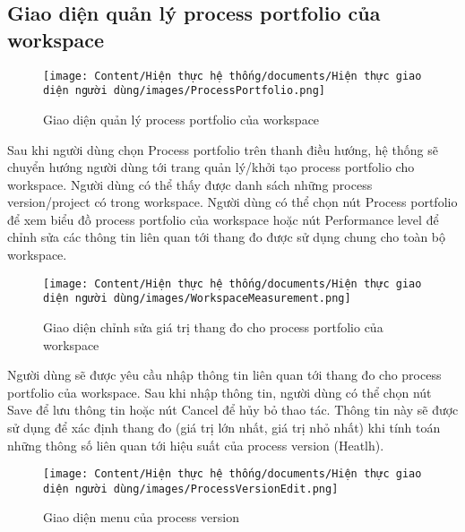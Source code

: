 \subsection{Giao diện quản lý process portfolio của workspace}

\begin{figure}[H]
    \centering
    \texttt{[image: Content/Hiện thực hệ thống/documents/Hiện thực giao diện người dùng/images/ProcessPortfolio.png]}
    \vspace{0.5cm}
    \caption{Giao diện quản lý process portfolio của workspace}
    \label{fig: Giao diện quản lý process portfolio của workspace}
\end{figure}

Sau khi người dùng chọn Process portfolio trên thanh điều hướng, hệ thống sẽ chuyển hướng người dùng tới trang quản lý/khởi tạo process portfolio cho workspace. Người dùng có thể thấy được danh sách những process version/project có trong workspace. Người dùng có thể chọn nút Process portfolio để xem biểu đồ process portfolio của workspace hoặc nút Performance level để chỉnh sửa các thông tin liên quan tới thang đo được sử dụng chung cho toàn bộ workspace.

\begin{figure}[H]
    \centering
    \texttt{[image: Content/Hiện thực hệ thống/documents/Hiện thực giao diện người dùng/images/WorkspaceMeasurement.png]}
    \vspace{0.5cm}
    \caption{Giao diện chỉnh sửa giá trị thang đo cho process portfolio của workspace}
    \label{fig: Giao diện chỉnh sửa giá trị thang đo cho process portfolio của workspace}
\end{figure}

Người dùng sẽ được yêu cầu nhập thông tin liên quan tới thang đo cho process portfolio của workspace. Sau khi nhập thông tin, người dùng có thể chọn nút Save để lưu thông tin hoặc nút Cancel để hủy bỏ thao tác. Thông tin này sẽ được sử dụng để xác định thang đo (giá trị lớn nhất, giá trị nhỏ nhất) khi tính toán những thông số liên quan tới hiệu suất của process version (Heatlh).

\begin{figure}[H]
    \centering
    \texttt{[image: Content/Hiện thực hệ thống/documents/Hiện thực giao diện người dùng/images/ProcessVersionEdit.png]}
    \vspace{0.5cm}
    \caption{Giao diện menu của process version}
    \label{fig: Giao diện menu của process version}
\end{figure}

